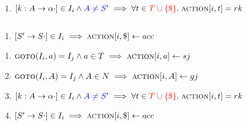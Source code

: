 \begin{frame}{}
  \begin{center}
    \begin{columns}
        
    \end{columns}

    \vspace{0.20cm}
    \begin{enumerate}[(3)]
      \centering
      \item $[k: A \to \alpha \cdot] \in I_{i} \land \textcolor{blue}{A \neq S'} \implies
        \forall t \in \textcolor{red}{T \cup \{\$\}}.\; \textsc{action}[i, t] = rk$
    \end{enumerate}
  \end{center}
\end{frame}

\begin{frame}{}
  \begin{center}
    \begin{columns}
        
    \end{columns}

    \vspace{0.20cm}
    \begin{enumerate}[(4)]
      \centering
      \item $[S' \to S \cdot] \in I_{i} \implies \textsc{action}[i, \$] \gets acc$
    \end{enumerate}
  \end{center}
\end{frame}

\begin{frame}{}
  \begin{center}

    \vspace{0.60cm}
    \begin{enumerate}[(1)]
      \setlength{\itemsep}{25pt}
      \item $\textsc{goto}(I_{i}, a) = I_{j} \land a \in T \implies \textsc{action}[i, a] \gets sj$
      \item $\textsc{goto}(I_{i}, A) = I_{j} \land A \in N \implies \textsc{action}[i, A] \gets gj$
      \item $[k: A \to \alpha \cdot] \in I_{i} \land \textcolor{blue}{A \neq S'} \implies
        \forall t \in \textcolor{red}{T \cup \{\$\}}.\; \textsc{action}[i, t] = rk$
      \item $[S' \to S \cdot] \in I_{i} \implies \textsc{action}[i, \$] \gets acc$
    \end{enumerate}
  \end{center}
\end{frame}

